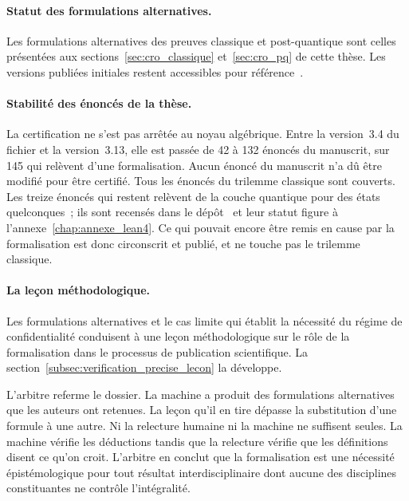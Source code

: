 \begin{sloppypar}
\paragraph{Statut des formulations alternatives.}
Les formulations alternatives des preuves classique et post-quantique sont
celles pr\'esent\'ees aux sections~\ref{sec:cro_classique}
et~\ref{sec:cro_pq} de cette th\`ese. Les versions publi\'ees initiales
restent accessibles pour r\'ef\'erence~\cite{MINKA2026CRO,MINKA2026PQCRO}.

\paragraph{Stabilit\'e des \'enonc\'es de la th\`ese.}
La certification ne s'est pas arr\^et\'ee au noyau alg\'ebrique. Entre la version~3.4 du
fichier et la version~3.13, elle est pass\'ee de 42 \`a 132 \'enonc\'es du manuscrit, sur 145 qui
rel\`event d'une formalisation. Aucun \'enonc\'e du manuscrit n'a d\^u \^etre modifi\'e pour \^etre
certifi\'e. Tous les \'enonc\'es du trilemme classique sont couverts. Les treize \'enonc\'es qui
restent rel\`event de la couche quantique pour des \'etats quelconques~; ils sont recens\'es dans
le d\'ep\^ot~\cite{CROTrilemmaDepot} et leur statut figure \`a l'annexe~\ref{chap:annexe_lean4}.
Ce qui pouvait encore \^etre remis en cause par la formalisation est donc circonscrit et
publi\'e, et ne touche pas le trilemme classique.

\paragraph{La le\c{c}on m\'ethodologique.}
Les formulations alternatives et le cas limite qui \'etablit la n\'ecessit\'e
du r\'egime de confidentialit\'e conduisent \`a une le\c{c}on
m\'ethodologique sur le r\^ole de la formalisation dans le processus de
publication scientifique. La
section~\ref{subsec:verification_precise_lecon} la d\'eveloppe.
\end{sloppypar}

\begin{boiteArbitre}
L'arbitre referme le dossier. La machine a produit des formulations
alternatives que les auteurs ont retenues. La le\c{c}on qu'il en tire
d\'epasse la substitution d'une formule \`a une autre. Ni la relecture
humaine ni la machine ne suffisent seules. La machine v\'erifie les
d\'eductions tandis que la relecture v\'erifie que les d\'efinitions disent ce
qu'on croit. L'arbitre en conclut que la formalisation est une n\'ecessit\'e
\'epist\'emologique pour tout r\'esultat interdisciplinaire dont aucune des
disciplines constituantes ne contr\^ole l'int\'egralit\'e.
\end{boiteArbitre}


